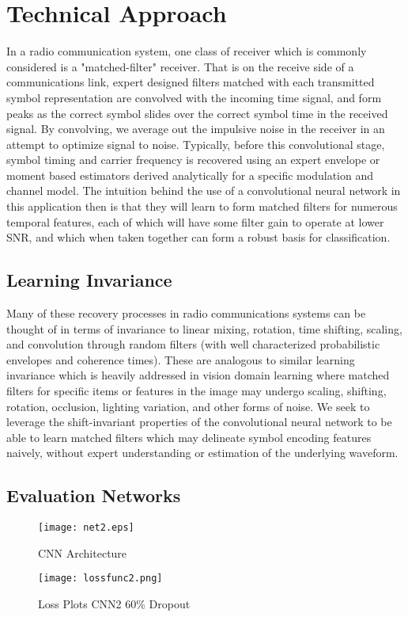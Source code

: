 \documentclass[runningheads,a4paper]{llncs}
\begin{document}
\section{Technical Approach}

In a radio communication system, one class of receiver which is commonly considered is a "matched-filter" receiver.  That is on the receive side of a communications link, expert designed filters matched with each transmitted symbol representation are convolved with the incoming time signal, and form peaks as the correct symbol slides over the correct symbol time in the received signal.   By convolving, we average out the impulsive noise in the receiver in an attempt to optimize signal to noise.  Typically, before this convolutional stage, symbol timing and carrier frequency is recovered using an expert envelope or moment based estimators derived analytically for a specific modulation and channel model.   The intuition behind the use of a convolutional neural network in this application then is that they will learn to form matched filters for numerous temporal features, each of which will have some filter gain to operate at lower SNR, and which when taken together can form a robust basis for classification.

\subsection{Learning Invariance}

Many of these recovery processes in radio communications systems can be thought of in terms of invariance to linear mixing, rotation, time shifting, scaling, and convolution through random filters (with well characterized probabilistic envelopes and coherence times).   These are analogous to similar learning invariance which is heavily addressed in vision domain learning where matched filters for specific items or features in the image may undergo scaling, shifting, rotation, occlusion, lighting variation, and other forms of noise.   We seek to leverage the shift-invariant properties of the convolutional neural network to be able to learn matched filters which may delineate symbol encoding features naively, without expert understanding or estimation of the underlying waveform.  

\subsection{Evaluation Networks}

\begin{figure}[ht]
\centering
\begin{minipage}[b]{0.45\linewidth}
      \texttt{[image: net2.eps]}
  \caption{CNN Architecture}\label{figure:network}
\end{minipage}
\quad
\begin{minipage}[b]{0.45\linewidth}
      \texttt{[image: lossfunc2.png]}
  \caption{Loss Plots CNN2 60\% Dropout}\label{figure:loss}
\end{minipage}
\end{figure}
\end{document}
